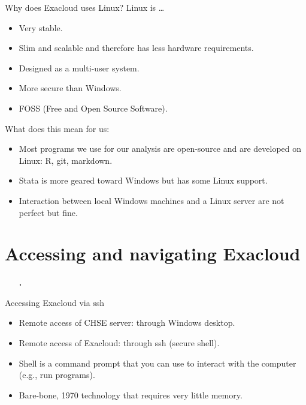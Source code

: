 \documentclass[12pt,t,xcolor=table]{beamer}
\begin{document}
\begin{frame}[label={sec:orgheadline3}]{Why does Exacloud uses Linux?}
Linux is \ldots{}

\begin{itemize}
\item Very stable.

\item Slim and scalable and therefore has less hardware requirements.

\item Designed as a multi-user system.

\item More secure than Windows.

\item FOSS (Free and Open Source Software).
\end{itemize}
\end{frame}

\begin{frame}[label={sec:orgheadline4}]{What does this mean for us:}
\begin{itemize}
\item Most programs we use for our analysis are open-source and are developed on Linux: R, git, markdown.

\item Stata is more geared toward Windows but has some Linux support.

\item Interaction between local Windows machines and a Linux server are not perfect but fine.
\end{itemize}
\end{frame}

\section{Accessing and navigating Exacloud}
\label{sec:orgheadline9}
\begin{frame}[c]{}
  \begin{itemize}
    \item[\bf\thesection.] \bf\insertsection
  \end{itemize}          
\end{frame}

\begin{frame}[label={sec:orgheadline6}]{Accessing Exacloud via ssh}
\begin{itemize}
\item Remote access of CHSE server: through Windows desktop.

\item Remote access of Exacloud: through ssh (secure shell).

\item Shell is a command prompt that you can use to interact with the computer (e.g., run programs).

\item Bare-bone, 1970 technology that requires very little memory.
\end{itemize}
\end{frame}
\end{document}
